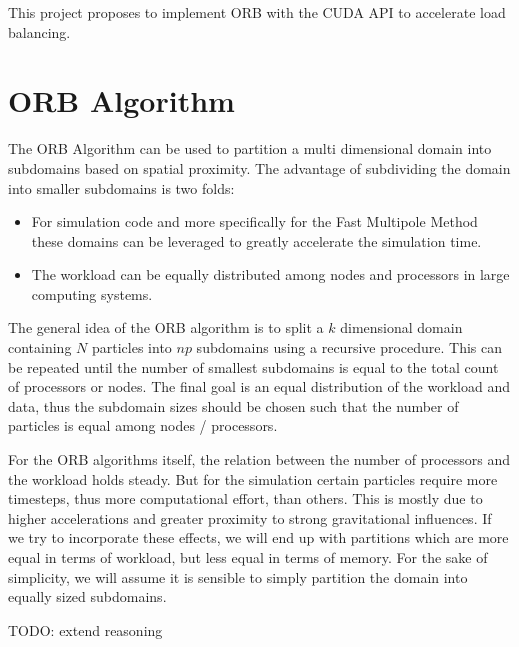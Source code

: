 \documentclass[]{article}
\begin{document}
This project proposes to implement ORB with the CUDA API to accelerate load balancing.

\section{ORB Algorithm}


The ORB Algorithm can be used to partition a multi dimensional domain into subdomains based on spatial proximity. The advantage of subdividing the domain into smaller subdomains is two folds:

\begin{itemize}
	\item For simulation code and more specifically for the Fast Multipole Method these domains can be leveraged to greatly accelerate the simulation time. 
	\item The workload can be equally distributed among nodes and processors in large computing systems.
\end{itemize} 


The general idea of the ORB algorithm is to split a $k$ dimensional domain containing $N$ particles into $np$ subdomains using a recursive procedure. This can be repeated until the number of smallest subdomains is equal to the total count of processors or nodes. The final goal is an equal distribution of the workload and data, thus the subdomain sizes should be chosen such that the number of particles is equal among nodes / processors.

For the ORB algorithms itself, the relation between the number of processors and the workload holds steady. But for the simulation certain particles require more timesteps, thus more computational effort, than others. This is mostly due to higher accelerations and greater proximity to strong gravitational influences. If we try to incorporate these effects, we will end up with partitions which are more equal in terms of workload, but less equal in terms of memory.  For the sake of simplicity, we will assume it is sensible to simply partition the domain into equally sized subdomains.

TODO: extend reasoning

\vspace{5mm}

\def\x{8}
\def\y{8}
\end{document}
